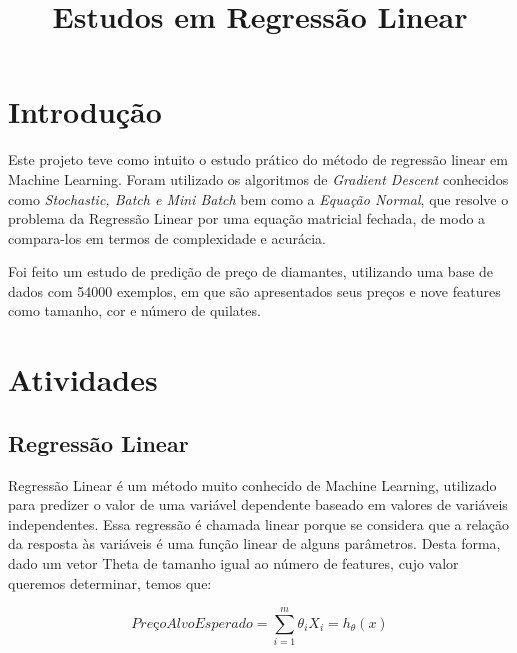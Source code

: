 \documentclass[conference]{IEEEtran}
\begin{document}
\title{Estudos em Regressão Linear}

\author{
\and
{}
}

\maketitle

\section{Introdução}

Este projeto teve como intuito o estudo prático do método de regressão linear em Machine Learning. Foram utilizado os algoritmos de \textit{Gradient Descent} conhecidos como \textit{Stochastic, Batch e Mini Batch} bem como a \textit{Equação Normal}, que resolve o problema da Regressão Linear por uma equação matricial fechada, de modo a compara-los em termos de complexidade e acurácia.~\cite{sandra}

Foi feito um estudo de predição de preço de diamantes, utilizando uma base de dados com 54000 exemplos, em que são apresentados seus preços e nove features como tamanho, cor e número de quilates.

\section{Atividades}

\subsection{Regressão Linear~\cite{handson}}

Regressão Linear é um método muito conhecido de Machine Learning, utilizado para predizer o valor de uma variável dependente baseado em valores de variáveis independentes. Essa regressão é chamada linear porque se considera que a relação da resposta às variáveis é uma função linear de alguns parâmetros. Desta forma, dado um vetor Theta de tamanho igual ao número de features, cujo valor queremos determinar, temos que:

\begin{equation} \label{eq:hx}
PreçoAlvoEsperado = \sum_{i=1}^{m} \theta_{i}X_{i} = h_{\theta}(x)
\end{equation}
\end{document}
